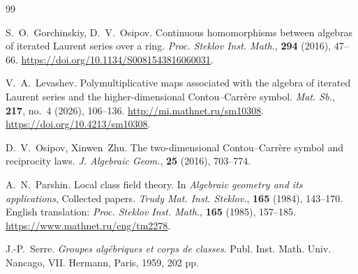 \documentclass[11pt,a4paper]{article}
\theoremstyle{plain}
\begin{document}
\begin{thebibliography}{99}
\small

S.~O.~Gorchinskiy, D.~V.~Osipov.
\newblock Continuous homomorphisms between algebras of iterated
Laurent series over a ring.
\newblock \emph{Proc. Steklov Inst. Math.},
\textbf{294} (2016), 47--66.
\newblock \url{https://doi.org/10.1134/S0081543816060031}.


V.~A.~Levashev.
\newblock Polymultiplicative maps associated with the algebra of iterated Laurent series and the higher-dimensional Contou--Carr\`ere symbol.
\newblock \emph{Mat. Sb.}, \textbf{217}, no.~4 (2026), 106--136.
\newblock \url{http://mi.mathnet.ru/sm10308}.
\newblock \url{https://doi.org/10.4213/sm10308}.

D.~V.~Osipov, Xinwen~Zhu.
\newblock The two-dimensional Contou--Carr\`ere symbol and reciprocity laws.
\newblock \emph{J. Algebraic Geom.}, \textbf{25} (2016), 703--774.

A.~N.~Parshin.
\newblock Local class field theory.
\newblock In \emph{Algebraic geometry and its applications},
Collected papers.
\newblock \emph{Trudy Mat. Inst. Steklov.},
\textbf{165} (1984), 143--170.
\newblock English translation:
\emph{Proc. Steklov Inst. Math.},
\textbf{165} (1985), 157--185.
\newblock \url{https://www.mathnet.ru/eng/tm2278}.


J.-P.~Serre.
\newblock \emph{Groupes alg\'ebriques et corps de classes}.
\newblock Publ. Inst. Math. Univ. Nancago, VII.
\newblock Hermann, Paris, 1959, 202 pp.

\end{thebibliography}
\end{document}
